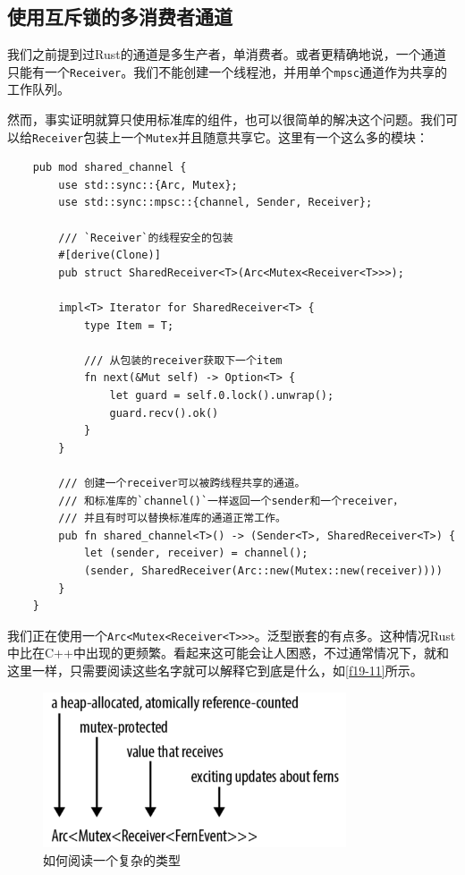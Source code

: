 \subsection{使用互斥锁的多消费者通道}
我们之前提到过Rust的通道是多生产者，单消费者。或者更精确地说，一个通道只能有一个\texttt{Receiver}。我们不能创建一个线程池，并用单个\texttt{mpsc}通道作为共享的工作队列。

然而，事实证明就算只使用标准库的组件，也可以很简单的解决这个问题。我们可以给\texttt{Receiver}包装上一个\texttt{Mutex}并且随意共享它。这里有一个这么多的模块：
\begin{verbatim}
    pub mod shared_channel {
        use std::sync::{Arc, Mutex};
        use std::sync::mpsc::{channel, Sender, Receiver};

        /// `Receiver`的线程安全的包装
        #[derive(Clone)]
        pub struct SharedReceiver<T>(Arc<Mutex<Receiver<T>>>);

        impl<T> Iterator for SharedReceiver<T> {
            type Item = T;

            /// 从包装的receiver获取下一个item
            fn next(&Mut self) -> Option<T> {
                let guard = self.0.lock().unwrap();
                guard.recv().ok()
            }
        }

        /// 创建一个receiver可以被跨线程共享的通道。
        /// 和标准库的`channel()`一样返回一个sender和一个receiver，
        /// 并且有时可以替换标准库的通道正常工作。
        pub fn shared_channel<T>() -> (Sender<T>, SharedReceiver<T>) {
            let (sender, receiver) = channel();
            (sender, SharedReceiver(Arc::new(Mutex::new(receiver))))
        }
    }
\end{verbatim}

我们正在使用一个\texttt{Arc<Mutex<Receiver<T>>>}。泛型嵌套的有点多。这种情况Rust中比在C++中出现的更频繁。看起来这可能会让人困惑，不过通常情况下，就和这里一样，只需要阅读这些名字就可以解释它到底是什么，如\autoref{f19-11}所示。

\begin{figure}[htbp]
    \centering
    \includegraphics[width=0.8\textwidth]{../img/f19-11.png}
    \caption{如何阅读一个复杂的类型}
    \label{f19-11}
\end{figure}


